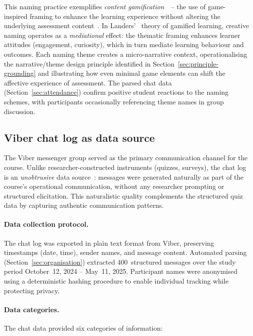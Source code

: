 This naming practice exemplifies \emph{content gamification}~\cite{SEABORN201514}~-- the use of game-inspired framing to enhance the learning experience without altering the underlying assessment content~\cite{Titova2025cte, KorniienkoSemerikov2024}. In Landers'~\cite{Landers2014} theory of gamified learning, creative naming operates as a \emph{mediational} effect: the thematic framing enhances learner attitudes (engagement, curiosity), which in turn mediate learning behaviour and outcomes. Each naming theme creates a micro-narrative context, operationalising the narrative/theme design principle identified in Section~\ref{sec:principle-grounding} and illustrating how even minimal game elements can shift the affective experience of assessment. The parsed chat data (Section~\ref{sec:attendance}) confirm positive student reactions to the naming schemes, with participants occasionally referencing theme names in group discussion.

\subsection{Viber chat log as data source}

The Viber messenger group served as the primary communication channel for the course. Unlike researcher-constructed instruments (quizzes, surveys), the chat log is an \emph{unobtrusive} data source~\cite{CohenManionMorrison2018}: messages were generated naturally as part of the course's operational communication, without any researcher prompting or structured elicitation. This naturalistic quality complements the structured quiz data by capturing authentic communication patterns.

\paragraph{Data collection protocol.}
The chat log was exported in plain text format from Viber, preserving timestamps (date, time), sender names, and message content. Automated parsing (Section~\ref{sec:organisation}) extracted 400~structured messages over the study period October~12, 2024 -- May~11, 2025. Participant names were anonymised using a deterministic hashing procedure to enable individual tracking while protecting privacy.

\paragraph{Data categories.}
The chat data provided six categories of information:

